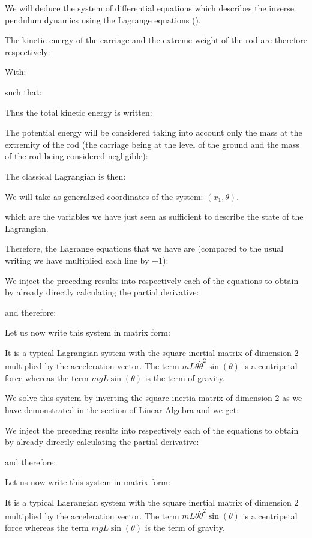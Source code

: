	We will deduce the system of differential equations which describes the inverse pendulum dynamics using the Lagrange equations ().

	The kinetic energy of the carriage and the extreme weight of the rod are therefore respectively:
	
	With:
	
 	such that:
	
 	Thus the total kinetic energy is written:
	
	The potential energy will be considered taking into account only the mass at the extremity of the rod (the carriage being at the level of the ground and the mass of the rod being considered negligible):
	
	The classical Lagrangian is then:
	
 	We will take as generalized coordinates of the system: $(x_1,\theta)$.

which are the variables we have just seen as sufficient to describe the state of the Lagrangian.

	Therefore, the Lagrange equations that we have are (compared to the usual writing we have multiplied each line by $-1$):
	
	We inject the preceding results into respectively each of the equations to obtain by already directly calculating the partial derivative:
	
 	and therefore:
	
	Let us now write this system in matrix form:
	
 	It is a typical Lagrangian system with the square inertial matrix of dimension $2$ multiplied by the acceleration vector. The term $mL\theta\dot{\theta}^2\sin(\theta)$ is a centripetal force whereas the term $mgL\sin(\theta)$ is the term of gravity.

	We solve this system by inverting the square inertia matrix of dimension $2$ as we have demonstrated in the section of Linear Algebra and we get:
	
	
	We inject the preceding results into respectively each of the equations to obtain by already directly calculating the partial derivative:
	
 	and therefore:
	
	Let us now write this system in matrix form:
	
 	It is a typical Lagrangian system with the square inertial matrix of dimension $2$ multiplied by the acceleration vector. The term $mL\theta\dot{\theta}^2\sin(\theta)$ is a centripetal force whereas the term $mgL\sin(\theta)$ is the term of gravity.

